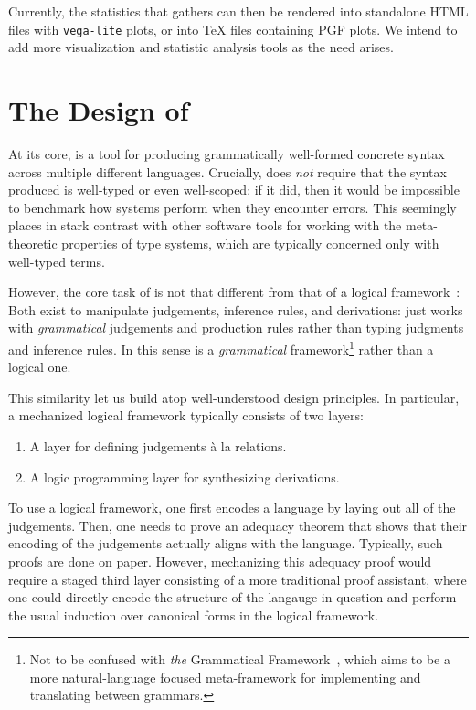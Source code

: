 \documentclass[a4paper,UKenglish,cleveref, autoref, thm-restate,anonymous]{lipics-v2021}
\begin{document}
Currently, the statistics that \panbench gathers can then be rendered into standalone HTML
files with \texttt{vega-lite} plots, or into \TeX{} files containing PGF plots. We intend to add more
visualization and statistic analysis tools as the need arises.

\section{The Design of \panbench}
\label{sec:design}

At its core, \panbench is a tool for producing grammatically well-formed concrete
syntax across multiple different languages. Crucially, \panbench does \emph{not}
require that the syntax produced is well-typed or even well-scoped: if it did,
then it would be impossible to benchmark how systems perform when they encounter
errors. This seemingly places \panbench in stark contrast with other software tools for
working with the meta-theoretic properties of type systems, which are typically
concerned only with well-typed terms.

However, the core task of \panbench is not that different from that of
a logical framework~\cite{Harper-Honsell-Plotkin:1993}: Both
exist to manipulate judgements, inference rules, and derivations:
\panbench just works with \emph{grammatical} judgements and production
rules rather than typing judgments and inference rules. In this sense
\panbench is a \emph{grammatical} framework\footnote{Not to be
  confused with \emph{the} Grammatical Framework~\cite{Ranta:2011},
  which aims to be a more natural-language focused meta-framework for
  implementing and translating between grammars.  } rather than a
logical one.

This similarity let us build \panbench atop well-understood design 
principles. In particular, a mechanized logical framework typically
consists of two layers:

\begin{enumerate}
\item A layer for defining judgements \`{a} la relations.
\item A logic programming layer for synthesizing derivations.
\end{enumerate}

To use a logical framework, one first encodes a language by laying out all of the
judgements. Then, one needs to prove an adequacy theorem that
shows that their encoding of the judgements actually aligns with the language. Typically,
such proofs are done on paper. However, mechanizing this adequacy proof would require a
staged third layer consisting of a more traditional proof assistant, where one could
directly encode the structure of the langauge in question and perform the usual
induction over canonical forms in the logical framework.
\end{document}
